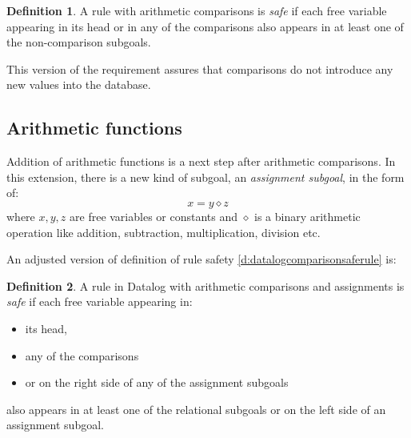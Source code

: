 \documentclass{pracamgr}
\theoremstyle{plain}
\theoremstyle{definition}
\newtheorem{defn}{Definition}[section]
\theoremstyle{remark}
\begin{document}
\begin{defn}
A rule with arithmetic comparisons is \emph{safe} if each free variable appearing in its head or in any of the comparisons also appears in at least one of the non-comparison subgoals.
\end{defn}\label{d:datalogcomparisonsaferule}

This version of the requirement assures that comparisons do not introduce any new values into the database.

\subsection{Arithmetic functions}

Addition of arithmetic functions is a next step after arithmetic comparisons. In this extension, there is a new kind of subgoal, an \emph{assignment subgoal}, in the form of:
$$x = y \diamond z$$
where $x, y, z$ are free variables or constants and $\diamond$ is a binary arithmetic operation like addition, subtraction, multiplication, division etc.


An adjusted version of definition of rule safety \ref{d:datalogcomparisonsaferule} is:

\begin{defn}
A rule in Datalog with arithmetic comparisons and assignments is \emph{safe} if each free variable appearing in:
\begin{itemize}
\item its head,
\item any of the comparisons 
\item or on the right side of any of the assignment subgoals
\end{itemize}
also appears in at least one of the relational subgoals or on the left side of an assignment subgoal.
\end{defn}\label{d:datalogeqsaferule}
\end{document}
